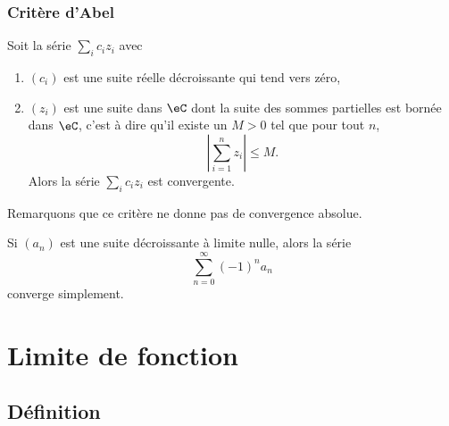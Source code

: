\subsubsection{Critère d'Abel}

\begin{proposition}
    Soit la série $\sum_i c_iz_i$ avec
    \begin{enumerate}
        \item $(c_i)$ est une suite réelle décroissante qui tend vers zéro,
        \item $(z_i)$ est une suite dans $\eC$ dont la suite des sommes partielles est bornée dans $\eC$, c'est à dire qu'il existe un $M>0$ tel que pour tout $n$,
        \begin{equation}
            \left| \sum_{i=1}^nz_i \right| \leq M.
        \end{equation}
        Alors la série $\sum_ic_iz_i$ est convergente.
    \end{enumerate}
\end{proposition}
Remarquons que ce critère ne donne pas de convergence absolue.

\begin{corollary}       \label{CoreMjIfw}
    Si \( (a_n)\) est une suite décroissante à limite nulle, alors la série
  \begin{equation}
    \sum_{n=0}^\infty {(-1)}^n a_n
  \end{equation}
  converge simplement.
\end{corollary}


\section{Limite de fonction}
\label{SecLimiteFontion}

\subsection{Définition}

